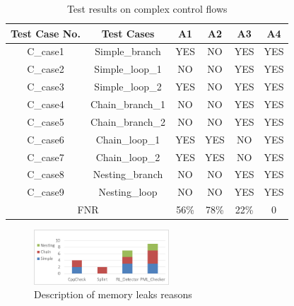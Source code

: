 \begin{table}[!h]
\center
\caption{Test results on complex control flows}\label{tab:2}
\begin{tabular}{|c|c|c|c|c|c|}
\hline
\textbf{Test Case No.} & \textbf{Test Cases} & \textbf{A1} & \textbf{A2} & \textbf{A}3 & \textbf{A4}\\
\hline
C\_case1	& Simple\_branch &	YES & NO & YES & YES\\
\hline
C\_case2	& Simple\_loop\_1 & NO &	NO & YES & YES\\
\hline
C\_case3	& Simple\_loop\_2	& YES &	NO & YES & YES\\
\hline
C\_case4	& Chain\_branch\_1 & NO & NO & YES & YES\\
\hline
C\_case5	& Chain\_branch\_2 &	NO	& NO & YES & YES\\
\hline
C\_case6	& Chain\_loop\_1 & YES & YES & NO & YES\\
\hline
C\_case7	& Chain\_loop\_2 & YES & YES & NO & YES\\
\hline
C\_case8	& Nesting\_branch & NO & NO & YES & YES\\
\hline
C\_case9 & Nesting\_loop & NO & NO & YES & YES\\
\hline
\multicolumn{2}{|c|}{FNR} & 56\% & 78\% & 22\% & 0\\
\hline
\end{tabular}
\end{table}

\begin{figure}
\center
\includegraphics[width=0.45\textwidth]{figure/fig8-fig12/fig8}
\caption{Description of memory leaks reasons}
\label{fig:8}
\end{figure}


